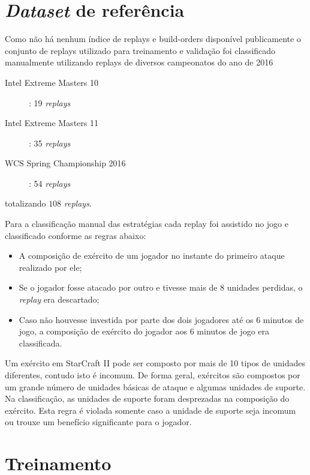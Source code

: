 		\section{\textit{Dataset} de referência}
Como não há nenhum índice de replays e build-orders disponível publicamente o conjunto de replays utilizado para treinamento e validação foi classificado manualmente utilizando replays de diversos campeonatos do ano de 2016

\begin{description}
	\item[Intel Extreme Masters 10]: 19 \textit{replays}
	\item[Intel Extreme Masters 11]: 35 \textit{replays}
	\item[WCS Spring Championship 2016]: 54 \textit{replays}
\end{description}

\noindent totalizando $108$ \textit{replays}.

Para a classificação manual das estratégias cada replay foi assistido no jogo e classificado conforme as regras abaixo:

\begin{itemize}
	\item A composição de exército de um jogador no instante do primeiro ataque realizado por ele;
	\item Se o jogador fosse atacado por outro e tivesse mais de 8 unidades perdidas, o \textit{replay} era descartado;
	\item Caso não houvesse investida por parte dos dois jogadores até os 6 minutos de jogo, a composição de exército do jogador aos 6 minutos de jogo era classificada.
\end{itemize}

Um exército em StarCraft II pode ser composto por mais de 10 tipos de unidades diferentes, contudo isto é incomum. De forma geral, exércitos são compostos por um grande número de unidades básicas de ataque e algumas unidades de suporte. Na classificação, as unidades de suporte foram desprezadas na composição do exército. Esta regra é violada somente caso a unidade de suporte seja incomum ou trouxe um benefício significante para o jogador.

		\section{Treinamento}

